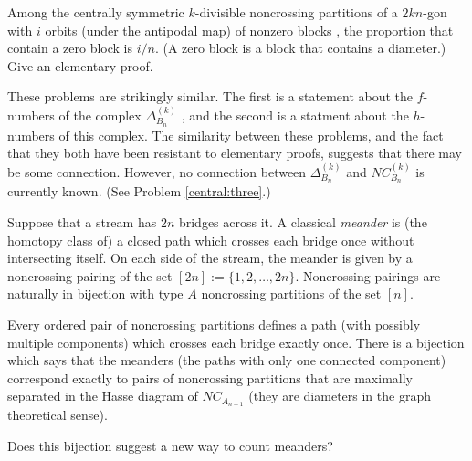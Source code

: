 \documentclass[12pt,letterpaper, reqno]{aimpl}
\begin{document}
\begin{problemblock}
\begin{problem}[2.4]
  Among the centrally symmetric $k$-divisible noncrossing partitions of a $2kn$-gon with $i$ orbits (under the antipodal map) of nonzero blocks \cite{armstrong, reiner}, the proportion that contain a zero block is $i/n$. (A zero block is a block that contains a diameter.) Give an elementary proof.
\end{problem}

\begin{remark}
 These problems are strikingly similar. The first is a statement about the $f$-numbers of the complex $\Delta_{B_n}^{(k)}$ \cite{fomin-reading}, and the second is a statment about the $h$-numbers of this complex. The similarity between these problems, and the fact that they both have been resistant to elementary proofs, suggests that there may be some connection. However, no connection between $\Delta_{B_n}^{(k)}$ and $NC_{B_n}^{(k)}$ is currently known. (See Problem \ref{central:three}.)
\end{remark}

\end{problemblock}

\begin{problemblock}
Suppose that a stream has $2n$ bridges across it. A classical \emph{meander} is (the homotopy class of) a closed path which crosses each bridge once without intersecting itself. On each side of the stream, the  meander is given by a noncrossing pairing of the set $[2n]:=\{1,2,\ldots,2n\}$. Noncrossing pairings are naturally in bijection with type $A$ noncrossing partitions of the set $[n]$.

Every ordered pair of noncrossing partitions defines a path (with possibly multiple components) which crosses each bridge exactly once. There is a bijection which says that the meanders (the paths with only one connected component) correspond exactly to pairs of noncrossing partitions that are maximally separated in the Hasse diagram of $NC_{A_{n-1}}$ (they are diameters in the graph theoretical sense).

\begin{problem}[2.5]
 Does this bijection suggest a new way to count meanders?
\end{problem}
\end{problemblock}
\end{document}
